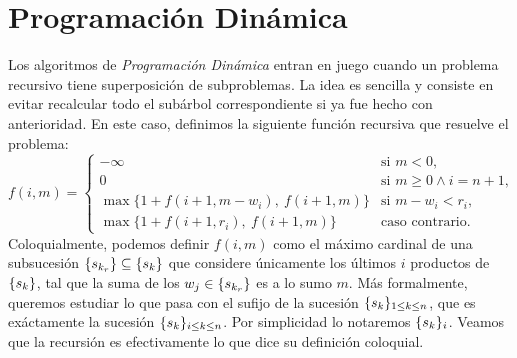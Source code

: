 \documentclass{article}
\DeclarePairedDelimiter\curl{\{}{\}}
\newcommand{\N}{\mathbb{N}}
\newcommand{\inN}[1]{#1 \in \N}
\newcommand{\sqe}[4]{\curl{#1_{#2}}_{#3 \leq #2 \leq #4}}
\begin{document}
\section{Programación Dinámica} \label{sec:dp}
Los algoritmos de \emph{Programación Dinámica} entran en juego cuando un problema recursivo tiene superposición de subproblemas. La idea es sencilla y consiste en evitar recalcular todo el subárbol correspondiente si ya fue hecho con anterioridad. En este caso, definimos la siguiente función recursiva que resuelve el problema:
\begin{equation} \label{eq:dp}
    f(i, m) = \begin{cases}
        -\infty & \text{si } m < 0,\\
        0 & \text{si } m\geq 0 \land i = n+1,\\
        \max \{ 1 + f(i+1, m - w_i),\ f(i+1, m) \} & \text{si } m - w_i < r_i,\\
        \max \{ 1 + f(i+1, r_i),\ f(i+1, m) \} & \text{caso contrario. }
    \end{cases}
\end{equation}
Coloquialmente, podemos definir $f(i, m)$ como el máximo cardinal de una subsucesión ${\curl{s_{k_{r}}} \subseteq \curl{s_{k}}}$ que considere únicamente los últimos $i$ productos de $\curl{s_{k}}$, tal que la suma de los ${w_{j} \in \curl{s_{k_{r}}}}$ es a lo sumo $m$. Más formalmente, queremos estudiar lo que pasa con el sufijo de la sucesión $\sqe{s}{k}{1}{n}$, que es exáctamente la sucesión $\sqe{s}{k}{i}{n}$. Por simplicidad lo notaremos $\curl{s_{k}}_{i}$. Veamos que la recursión es efectivamente lo que dice su definición coloquial.
\end{document}
